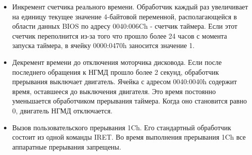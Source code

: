\documentclass[14pt, a4paper]{article}
\begin{document}
	\begin{itemize}
		\item Инкремент счетчика реального времени. Обработчик каждый раз увеличивает на единицу текущее значение 4-байтовой переменной, располагающейся в области данных BIOS по адресу 0040:006Ch - счетчик таймера. Если этот счетчик переполнится из-за того что прошло более 24 часов с момента запуска таймера, в ячейку 0000:0470h заносится значение 1.
		
		\item Декремент времени до отключения моторчика дисковода.
		Если после последнего обращения к НГМД прошло более 2 секунд, обработчик прерывания выключает двигатель. Ячейка с адресом 0040:0040h содержит время, оставшееся до выключения двигателя. Это время постоянно уменьшается обработчиком прерывания таймера. Когда оно становится равно 0, двигатель НГМД отключается.
		
		\item Вызов пользовательского прерывания 1Ch.
		Его стандартный обработчик состоит из одной команды IRET.
		Во время выполнения прерывания 1Ch все аппаратные прерывания запрещены.
	\end{itemize}
	
\end{document}
